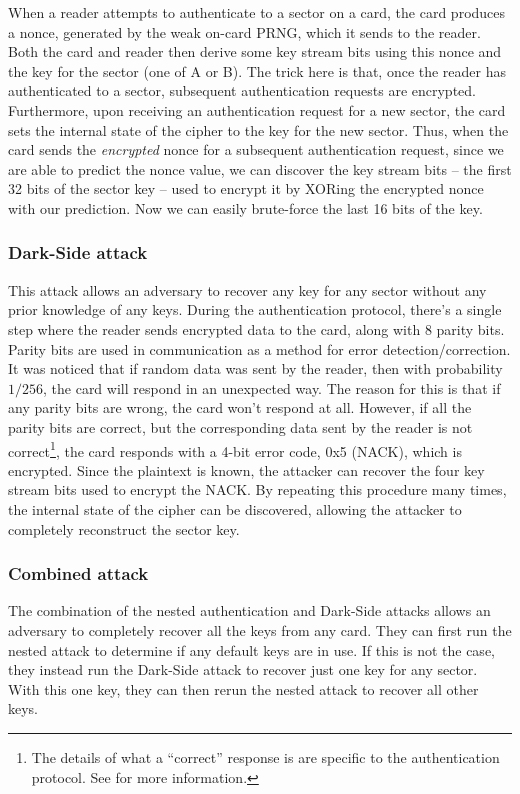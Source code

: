\documentclass[12pt,a4paper,twoside,openright]{report}
\begin{document}
When a reader attempts to authenticate to a sector on a card, the card produces a nonce, generated by the weak on-card PRNG, which it sends to the reader. Both the card and reader then derive some key stream bits using this nonce and the key for the sector (one of A or B). The trick here is that, once the reader has authenticated to a sector, subsequent authentication requests are encrypted. Furthermore, upon receiving an authentication request for a new sector, the card sets the internal state of the cipher to the key for the new sector. Thus, when the card sends the \emph{encrypted} nonce for a subsequent authentication request, since we are able to predict the nonce value, we can discover the key stream bits -- the first 32 bits of the sector key -- used to encrypt it by XORing the encrypted nonce with our prediction. Now we can easily brute-force the last 16 bits of the key.

\subsubsection{Dark-Side attack}

This attack allows an adversary to recover any key for any sector without any prior knowledge of any keys. During the authentication protocol, there's a single step where the reader sends encrypted data to the card, along with 8 parity bits. Parity bits are used in communication as a method for error detection/correction. It was noticed that if random data was sent by the reader, then with probability $1/256$, the card will respond in an unexpected way. The reason for this is that if any parity bits are wrong, the card won't respond at all. However, if all the parity bits are correct, but the corresponding data sent by the reader is not correct\footnote{The details of what a ``correct'' response is are specific to the authentication protocol. See \cite{darkside} for more information.}, the card responds with a 4-bit error code, 0x5 (NACK), which is encrypted. Since the plaintext is known, the attacker can recover the four key stream bits used to encrypt the NACK. By repeating this procedure many times, the internal state of the cipher can be discovered, allowing the attacker to completely reconstruct the sector key.

\subsubsection{Combined attack}

The combination of the nested authentication and Dark-Side attacks allows an adversary to completely recover all the keys from any card. They can first run the nested attack to determine if any default keys are in use. If this is not the case, they instead run the Dark-Side attack to recover just one key for any sector. With this one key, they can then rerun the nested attack to recover all other keys.
\end{document}
